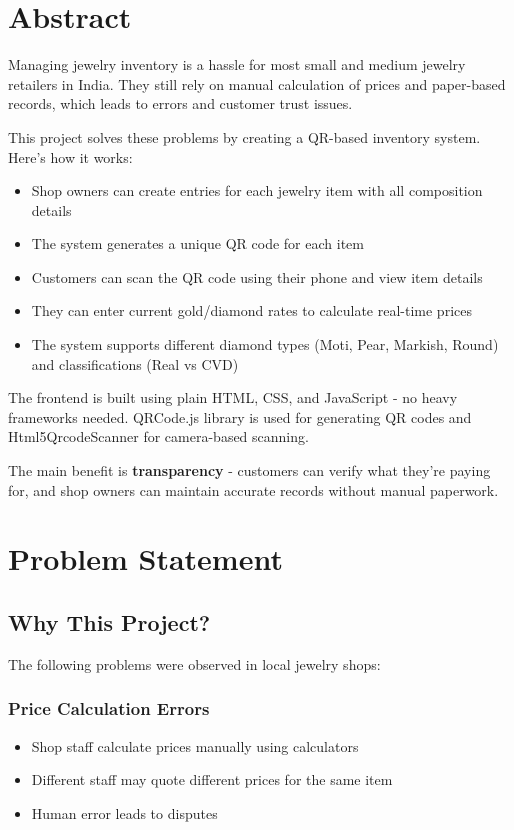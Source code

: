 \documentclass[12pt,a4paper]{article}
\begin{document}
\section{Abstract}

Managing jewelry inventory is a hassle for most small and medium jewelry retailers in India. They still rely on manual calculation of prices and paper-based records, which leads to errors and customer trust issues.

This project solves these problems by creating a QR-based inventory system. Here's how it works:

\begin{itemize}
    \item Shop owners can create entries for each jewelry item with all composition details
    \item The system generates a unique QR code for each item
    \item Customers can scan the QR code using their phone and view item details
    \item They can enter current gold/diamond rates to calculate real-time prices
    \item The system supports different diamond types (Moti, Pear, Markish, Round) and classifications (Real vs CVD)
\end{itemize}

The frontend is built using plain HTML, CSS, and JavaScript - no heavy frameworks needed. QRCode.js library is used for generating QR codes and Html5QrcodeScanner for camera-based scanning.

The main benefit is \textbf{transparency} - customers can verify what they're paying for, and shop owners can maintain accurate records without manual paperwork.

\section{Problem Statement}

\subsection{Why This Project?}

The following problems were observed in local jewelry shops:

\subsubsection{Price Calculation Errors}
\begin{itemize}
    \item Shop staff calculate prices manually using calculators
    \item Different staff may quote different prices for the same item
    \item Human error leads to disputes
\end{itemize}
\end{document}
